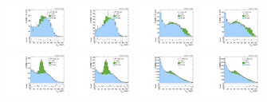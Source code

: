 \begin{figure}[htbp]
  \centering
  \includegraphics[width=0.18\textwidth]{fig/fitValidation/PostFit_SR_MJJ__mu_HP_bb_LDy_Run2.pdf}
  \includegraphics[width=0.18\textwidth]{fig/fitValidation/PostFit_SR_MJJ__e_HP_bb_LDy_Run2.pdf}
  \includegraphics[width=0.18\textwidth]{fig/fitValidation/PostFit_SR_MJJ__mu_LP_bb_LDy_Run2.pdf}
  \includegraphics[width=0.18\textwidth]{fig/fitValidation/PostFit_SR_MJJ__e_LP_bb_LDy_Run2.pdf}\\
  \includegraphics[width=0.18\textwidth]{fig/fitValidation/PostFit_SR_MJJ__mu_HP_nobb_LDy_Run2.pdf}
  \includegraphics[width=0.18\textwidth]{fig/fitValidation/PostFit_SR_MJJ__e_HP_nobb_LDy_Run2.pdf}
  \includegraphics[width=0.18\textwidth]{fig/fitValidation/PostFit_SR_MJJ__mu_LP_nobb_LDy_Run2.pdf}
  \includegraphics[width=0.18\textwidth]{fig/fitValidation/PostFit_SR_MJJ__e_LP_nobb_LDy_Run2.pdf}\\

\end{figure}
